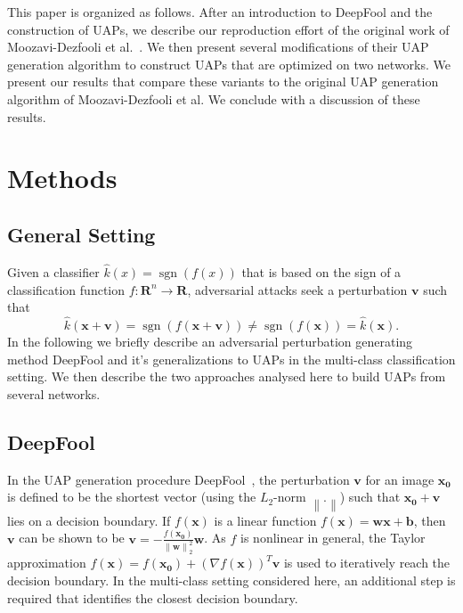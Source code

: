 \documentclass[runningheads]{llncs}
\DeclareMathOperator{\sgn}{sgn}
\newcommand{\xn}{\ensuremath{\mathbf{x_0}}}
\newcommand{\xb}{\ensuremath{\mathbf{x}}}
\newcommand{\vb}{\ensuremath{\mathbf{v}}}
\begin{document}
This paper is organized as follows. After an introduction to DeepFool and the construction of UAPs, we describe our reproduction effort of the original work of Moozavi-Dezfooli et al.~\cite{moosavidezfooli_universal_2017}. We then present several modifications of their UAP generation algorithm to construct UAPs that are optimized on two networks. We present our results that compare these variants to the original UAP generation algorithm of Moozavi-Dezfooli et al. We conclude with a discussion of these results.

\section{Methods}
\subsection{General Setting}
Given a classifier \(\hat{k}(x)=\sgn\left(f(x)\right)\) that is based on the sign of a classification function \(f:\mathbf{R}^n\rightarrow\mathbf{R}\), adversarial attacks seek a perturbation \(\vb\) such that \[\hat{k}(\xb+\vb)=\sgn\left(f(\xb+\vb)\right)\neq \sgn\left(f(\xb)\right)=\hat{k}(\xb).\] 
In the following we briefly describe an adversarial perturbation generating method DeepFool and it's generalizations to UAPs in the multi-class classification setting. We then describe the two approaches analysed here to build UAPs from several networks. 

\subsection{DeepFool}
In the UAP generation procedure DeepFool~\cite{moosavi-dezfooli_deepfool_2016}, the perturbation \(\mathbf{v}\) for an image \(\xn\) is defined to be the shortest vector (using the \(L_2\)-norm \(\left\|.\right\|\)) such that \(\xn+\mathbf{v}\) lies on a decision boundary. 
If $f(\xb)$ is a linear function $f(\xb)=\mathbf{w} \xb+\mathbf{b}$, then \(\mathbf{v}\) can be shown to be \(\mathbf{v}=-\frac{f(\xn)}{\left\|\mathbf{w}\right\|_2^2}\mathbf{w}\). As \(f\) is nonlinear in general, the Taylor approximation \(f(\xb)=f(\xn)+\left(\nabla f(\mathbf{x})\right)^T\mathbf{v}\) is used to iteratively reach the decision boundary. 
In the multi-class setting considered here, an additional step is required that identifies the closest decision boundary. 
\end{document}
